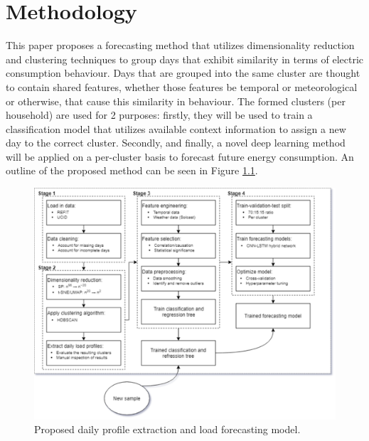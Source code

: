 \chapter{Methodology}
\label{ch:Methodology}
This paper proposes a forecasting method that utilizes dimensionality reduction and clustering techniques to group days that exhibit similarity in terms of electric consumption behaviour. Days that are grouped into the same cluster are thought to contain shared features, whether those features be temporal or meteorological or otherwise, that cause this similarity in behaviour. The formed clusters (per household) are used for 2 purposes: firstly, they will be used to train a classification model that utilizes available context information to assign a new day to the correct cluster. Secondly, and finally, a novel deep learning method will be applied on a per-cluster basis to forecast future energy consumption. An outline of the proposed method can be seen in Figure \ref{fig:Proposed-Model}.

\begin{figure}[H]
    \centering
    \includegraphics[width=\textwidth]{Images/Chapter 6/Proposed-Model.pdf}
    \caption{Proposed daily profile extraction and load forecasting model.}
    \label{fig:Proposed-Model}
\end{figure}

